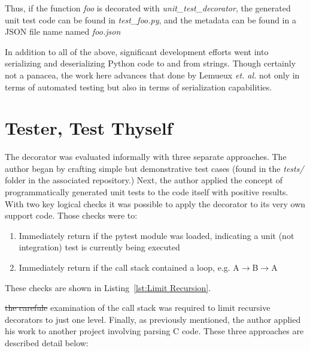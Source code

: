 \documentclass[10pt, conference]{IEEEtran}
\makeatletter
\providecommand{\DIFadd}[1]{{\protect\color{blue}\uwave{#1}}} %
\providecommand{\DIFdel}[1]{{\protect\color{red}\sout{#1}}} %
\providecommand{\DIFaddbegin}{} %
\providecommand{\DIFaddend}{} %
\providecommand{\DIFdelbegin}{} %
\providecommand{\DIFdelend}{} %
\newcommand{\DIFscaledelfig}{0.5}
\newlength{\DIFdelgraphicswidth} %
\newlength{\DIFdelgraphicsheight} %
\newcommand{\DIFaddincludegraphics}[2][]{{\color{blue}\fbox{\DIFOincludegraphics[#1]{#2}}}} %
\newcommand{\DIFdelincludegraphics}[2][]{%
\sbox{\DIFdelgraphicsbox}{\DIFOincludegraphics[#1]{#2}}%
\settoboxwidth{\DIFdelgraphicswidth}{\DIFdelgraphicsbox} %
\settoboxtotalheight{\DIFdelgraphicsheight}{\DIFdelgraphicsbox} %
\scalebox{\DIFscaledelfig}{%
\parbox[b]{\DIFdelgraphicswidth}{\usebox{\DIFdelgraphicsbox}\\[-\baselineskip] \rule{\DIFdelgraphicswidth}{0em}}\llap{\resizebox{\DIFdelgraphicswidth}{\DIFdelgraphicsheight}{%
\setlength{\unitlength}{\DIFdelgraphicswidth}%
\begin{picture}(1,1)%
\thicklines\linethickness{2pt} %
{\color[rgb]{1,0,0}\put(0,0){\framebox(1,1){}}}%
{\color[rgb]{1,0,0}\put(0,0){\line( 1,1){1}}}%
{\color[rgb]{1,0,0}\put(0,1){\line(1,-1){1}}}%
\end{picture}%
}\hspace*{3pt}}} %
} %
\DeclareRobustCommand{\DIFaddbegin}{\DIFOaddbegin \let\includegraphics\DIFaddincludegraphics} %
\DeclareRobustCommand{\DIFaddend}{\DIFOaddend \let\includegraphics\DIFOincludegraphics} %
\DeclareRobustCommand{\DIFdelbegin}{\DIFOdelbegin \let\includegraphics\DIFdelincludegraphics} %
\DeclareRobustCommand{\DIFdelend}{\DIFOaddend \let\includegraphics\DIFOincludegraphics} %
\let\sout@orig\sout %
\renewcommand{\sout}[1]{\ifmmode\text{\sout@orig{\ensuremath{#1}}}\else\sout@orig{#1}\fi} %
\makeatother
\begin{document}
Thus, if the function \textit{foo} is decorated with \textit{unit\_test\_decorator},
the generated unit test code can be found in \textit{test\_foo.py}, and the 
metadata can be found in a JSON file name named \textit{foo.json}

In addition to all of the above, significant development efforts went into 
serializing and deserializing Python code to and from strings.  Though
certainly not a panacea, the work here advances that done by 
Lemueux \textit{et. al.} \cite{lemieux2023codamosa} not only in terms of 
automated testing but also in terms of serialization capabilities.




 \section{Tester, Test Thyself}\label{sec:evaluation}

The decorator was evaluated informally with three separate approaches.
The author began by crafting simple but demonstrative test cases 
(found in the \textit{tests/} folder in the associated repository.) Next,
the author applied the concept of programmatically generated unit tests
to the code itself with positive results. With two key logical checks it
was possible to apply the decorator to its very own support code.  Those
checks were to:

\begin{enumerate}
  \item Immediately return if the pytest module was loaded, indicating a unit (not integration) test is currently being executed
  \item Immediately return if the call stack contained a loop, e.g. A$\rightarrow$B$\rightarrow$A
\end{enumerate}

These checks are shown in Listing~\ref{lst:Limit Recursion}.

\DIFdelbegin %
\DIFdelend \DIFaddbegin 
\DIFaddend 

\DIFdelbegin \DIFdel{the carefule }\DIFdelend \DIFaddbegin \DIFadd{Careful }\DIFaddend examination of the call stack was required to limit 
recursive decorators to just one level. Finally, as previously mentioned, 
the author applied his work to another project involving parsing C code. 
These three approaches are described detail below:
\end{document}
